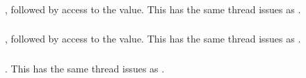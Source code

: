\documentclass{article}
\begin{document}
\subsubsection{}

\subsubsection{}
\begin{adi3}, followed by access to the value.
This has the same thread issues as .
\end{adi3}

\subsubsection{}
\begin{adi3}, followed by access to the value.
This has the same thread issues as .
\end{adi3}

\subsubsection{}
\begin{adi3}.
This has the same thread issues as .
\end{adi3}


\subsubsection{}
\subsubsection{}
\subsubsection{}
\subsubsection{}
\end{document}
